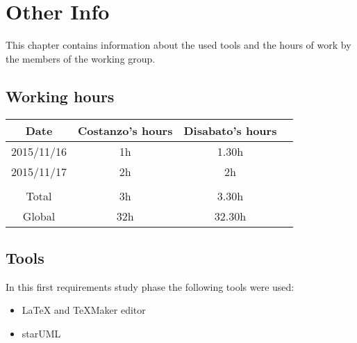 \documentclass[../dd]{subfiles}
\begin{document}
\chapter{Other Info}
\label{other_info}

This chapter contains information about the used tools and the hours of work by the members of the working group.

\section{Working hours}
\begin{table}[h!]
\begin{tabular}{cccc}
\hline
Date & Costanzo's hours & Disabato's hours  &    \\ \hline
2015/11/16 & 1h & 1.30h &    \\ \hline
2015/11/17 & 2h & 2h &    \\ \hline \\
Total & 3h & 3.30h & \\ \hline
Global & 32h & 32.30h & \\ \hline

\end{tabular}
\end{table}

\section{Tools}
In this first requirements study phase the following tools were used:
\begin{itemize}
	\item \LaTeX{} and TeXMaker editor
	\item starUML
\end{itemize}
\end{document}
